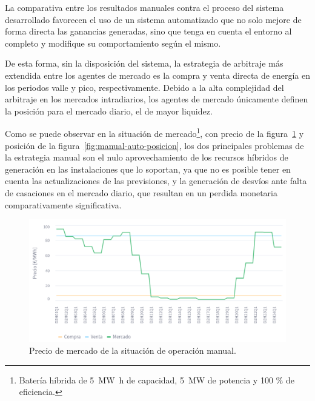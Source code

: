 La comparativa entre los resultados manuales contra el proceso del sistema desarrollado favorecen el uso de un sistema automatizado que no solo mejore de forma directa las ganancias generadas, sino que tenga en cuenta el entorno al completo y modifique su comportamiento según el mismo.

De esta forma, sin la disposición del sistema, la estrategia de arbitraje más extendida entre los agentes de mercado es la compra y venta directa de energía en los periodos valle y pico, respectivamente. Debido a la alta complejidad del arbitraje en los mercados intradiarios, los agentes de mercado únicamente definen la posición para el mercado diario, el de mayor liquidez.

Como se puede observar en la situación de mercado\footnote{Batería híbrida de \SI{5}{{\mega\watt\hour}} de capacidad, \SI{5}{{\mega\watt}} de potencia y 100 \% de eficiencia.}, con precio de la figura~\ref{fig:manual-auto-precio} y posición de la figura~\ref{fig:manual-auto-posicion}, los dos principales problemas de la estrategia manual son el nulo aprovechamiento de los recursos híbridos de generación en las instalaciones que lo soportan, ya que no es posible tener en cuenta las actualizaciones de las previsiones, y la generación de desvíos ante falta de casaciones en el mercado diario, que resultan en un perdida monetaria comparativamente significativa.

\begin{figure}
  \centering
  \includegraphics[width=0.75\linewidth]{figures/manual-auto-precio.png}
  \caption[Precio de mercado de la situación de operación manual.]{Precio de mercado de la situación de operación manual.}%
  \label{fig:manual-auto-precio}
\end{figure}

